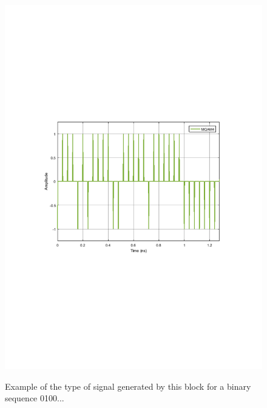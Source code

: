 \begin{figure}[h]
	\centering
	\includegraphics[width=\textwidth]{./lib/discrete_to_continuous_time/figures/MQAM_discrete_to_continuous_time_output.pdf}
	\label{MQAM4_DeterministicAppendZeros}\caption{Example of the type of signal generated by this block for a binary sequence 0100...}
\end{figure}


\pagebreak
